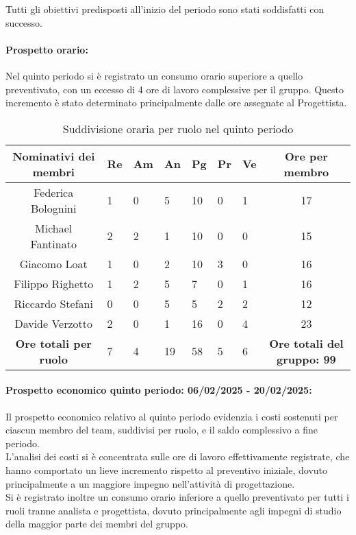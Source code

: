 Tutti gli obiettivi predisposti all'inizio del periodo sono stati soddisfatti con successo.\\

\newpage
\paragraph{Prospetto orario: }
Nel quinto periodo si è registrato un consumo orario superiore a quello preventivato, con un eccesso di 4 ore di lavoro complessive per il gruppo. Questo incremento è stato determinato principalmente dalle ore assegnate al Progettista.
\begin{table}[h!]
    \centering
    \renewcommand{\arraystretch}{1.5}
    \begin{tabularx}{\textwidth}{|c|X|X|X|X|X|X|c|}\hline
    \rowcolor[HTML]{FFD700} 
    \textbf{Nominativi dei membri} & \textbf{Re} & \textbf{Am} & \textbf{An} & \textbf{Pg} & \textbf{Pr} & \textbf{Ve} & \textbf{Ore per membro} \\ \hline
    Federica Bolognini & 1 & 0 & 5 & 10 & 0 & 1 & 17  \\ \hline
    Michael Fantinato  & 2 & 2 & 1 & 10 & 0 & 0 & 15  \\ \hline
    Giacomo Loat       & 1 & 0 & 2 & 10 & 3 & 0 & 16 \\ \hline
    Filippo Righetto   & 1 & 2 & 5 & 7 & 0 & 1 & 16  \\ \hline
    Riccardo Stefani   & 0 & 0 & 5 & 5 & 2 & 2 & 12 \\ \hline
    Davide Verzotto    & 2 & 0 & 1 & 16 & 0 & 4 & 23  \\ \hline
    \rowcolor[HTML]{FFD700} 
    \textbf{Ore totali per ruolo} & 7 & 4 & 19 & 58 & 5 & 6 & \textbf{Ore totali del gruppo: 99} \\ \hline
    \end{tabularx}
    \caption{Suddivisione oraria per ruolo nel quinto periodo}
\end{table}

\paragraph{Prospetto economico quinto periodo: 06/02/2025 - 20/02/2025: }
Il prospetto economico relativo al quinto periodo evidenzia i costi sostenuti per ciascun membro del team, suddivisi per ruolo, e il saldo complessivo a fine periodo.\\
L'analisi dei costi si è concentrata sulle ore di lavoro effettivamente registrate, che hanno comportato un lieve incremento rispetto al preventivo iniziale, dovuto principalmente a un maggiore impegno nell'attività di progettazione.\\
Si è registrato inoltre un consumo orario inferiore a quello preventivato per tutti i ruoli tranne analista e progettista, dovuto principalmente agli impegni di studio della maggior parte dei membri del gruppo.\\

